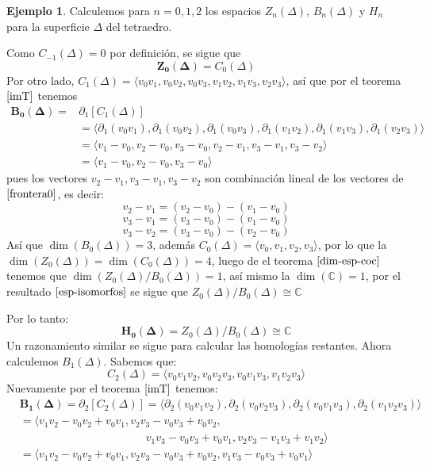 \documentclass[12pt]{book}
\theoremstyle{definition}
\newtheorem{example}[theorem]{Ejemplo}
\newcounter{in}
\newcounter{ini}
\begin{document}
\begin{example}
  Calculemos para $n=0, 1, 2$ los espacios $Z_{n}(\Delta)$,
  $B_{n}(\Delta)$ y $H_{n}$ para la superficie $\Delta$ del tetraedro.

  Como $C_{-1}(\Delta)=0$ por definición, se sigue que
  $$\boldsymbol{Z_{0}(\Delta)}=C_{0}(\Delta)$$
  Por otro lado, $C_{1}(\Delta)=\langle v_{0}v_{1},v_{0}v_{2},v_{0}v_{3},v_{1}v_{2},v_{1}v_{3},v_{2}v_{3}\rangle$,
  así que por el teorema $\ref{imT}$ tenemos 
  \begin{align}
    \label{frontera0}
    \boldsymbol{B_{0}(\Delta)}=&\partial_{1}[C_{1}(\Delta)]\nonumber\\
    &=\langle \partial_{1}(v_{0}v_{1}),\partial_{1}(v_{0}v_{2}),\partial_{1}(v_{0}v_{3}),\partial_{1}(v_{1}v_{2}),\partial_{1}(v_{1}v_{3}),\partial_{1}(v_{2}v_{3})\rangle\nonumber\\
    &=\langle v_{1}-v_{0},v_{2}-v_{0},v_{3}-v_{0},v_{2}-v_{1},v_{3}-v_{1},v_{3}-v_{2}\rangle\nonumber\\
    &=\langle v_{1}-v_{0},v_{2}-v_{0},v_{3}-v_{0}\rangle
  \end{align} 
  pues los vectores $v_{2}-v_{1}, v_{3}-v_{1}, v_{3}-v_{2}$ son
  combinación lineal de los vectores de $\ref{frontera0}$, es decir:
  $$v_{2}-v_{1}=(v_{2}-v_{0})-(v_{1}-v_{0})$$
  $$v_{3}-v_{1}=(v_{3}-v_{0})-(v_{1}-v_{0})$$
  $$v_{3}-v_{2}=(v_{3}-v_{0})-(v_{2}-v_{0})$$
  Así que $\dim(B_{0}(\Delta))=3$, además $C_{0}(\Delta)=\langle
  v_{0},v_{1},v_{2},v_{3}\rangle$, por lo que la
  $\dim(Z_{0}(\Delta))=\dim(C_{0}(\Delta))=4$, luego de el teorema
  $\ref{dim-esp-coc}$ tenemos que
  $\dim(Z_{0}(\Delta)/B_{0}(\Delta))=1$, así mismo la
  $\dim(\mathbb{C})=1$, por el resultado $\ref{esp-isomorfos}$ se sigue
  que $Z_{0}(\Delta)/B_{0}(\Delta)\cong \mathbb{C}$

  Por lo tanto:
  $$\boldsymbol{H_{0}(\Delta)}=Z_{0}(\Delta)/B_{0}(\Delta)\cong \mathbb{C}$$
  Un razonamiento similar se sigue para calcular las homologías restantes.
  Ahora calculemos $B_{1}(\Delta)$. Sabemos que:
  $$C_{2}(\Delta)=\langle
  v_{0}v_{1}v_{2},v_{0}v_{2}v_{3},v_{0}v_{1}v_{3},v_{1}v_{2}v_{3}\rangle$$
  Nuevamente por el teorema $\ref{imT}$ tenemos:
  \begin{align}  
    \label{generadores-B1}
    &\boldsymbol{B_{1}(\Delta)}=\partial_{2}[C_{2}(\Delta)]=\langle\partial_{2}(v_{0}v_{1}v_{2}),\partial_{2}(v_{0}v_{2}v_{3}),\partial_{2}(v_{0}v_{1}v_{3}),\partial_{2}
    (v_{1}v_{2}v_{3})\rangle \nonumber\\
    &=\langle v_{1}v_{2}-v_{0}v_{2}+v_{0}v_{1},v_{2}v_{3}-v_{0}v_{3}+v_{0}v_{2},\nonumber\\
    &\phantom{{}=v_{1}v_{2}-v_{0}v_{2}+v_{0}v_{1},v_{2}v_{3}}v_{1}v_{3}-v_{0}v_{3}+v_{0}v_{1},v_{2}v_{3}-v_{1}v_{3}+v_{1}v_{2}\rangle\nonumber\\
    &=\langle v_{1}v_{2}-v_{0}v_{2}+v_{0}v_{1},v_{2}v_{3}-v_{0}v_{3}+v_{0}v_{2},v_{1}v_{3}-v_{0}v_{3}+v_{0}v_{1}\rangle
  \end{align} 
 

\end{example}
\end{document}
